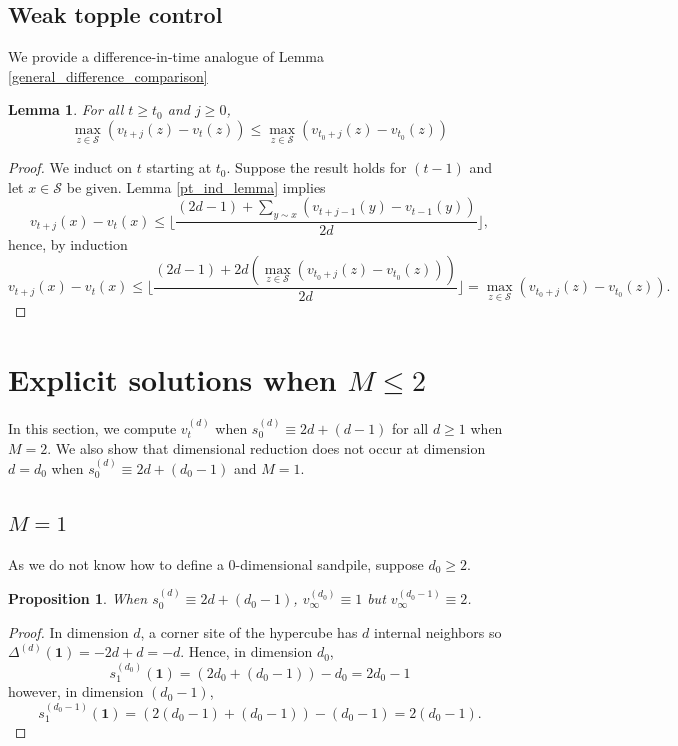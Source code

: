 \documentclass[12pt]{amsart}
\newtheorem{prop}{Proposition}[section]
\newtheorem{lemma}[theorem]{Lemma}
\begin{document}
	
	\subsection{Weak topple control}	
	We provide a difference-in-time analogue of Lemma \ref{general_difference_comparison}

	\begin{lemma} \label{topple_limit}
	For all $t \geq t_0$ and $j \geq 0$, 
	\[
	\max_{z \in \mathcal{S}} \left( v_{t+j}(z) - v_t(z) \right) \leq \max_{z \in \mathcal{S}} \left( v_{t_0+j}(z) - v_{t_0}(z) \right)
	\]
	\end{lemma}

	
	\begin{proof}
		We induct on $t$ starting at $t_0$. Suppose the result holds for $(t-1)$
		and let $x \in \mathcal{S}$ be given.
		Lemma \ref{pt_ind_lemma} implies  
		\[
		v_{t + j}(x) - v_{t}(x) \leq \lfloor \frac{ (2d-1) + \sum_{y \sim x} \left(v_{t+j-1}(y) - v_{t-1}(y) \right) }{2 d} \rfloor, 
		\]		
		hence, by induction 
		\[
			v_{t + j}(x) - v_{t}(x) \leq \lfloor \frac{ (2d-1) + 2 d\left( \max_{z \in \mathcal{S}} \left( v_{t_0+j}(z) - v_{t_0}(z) \right) \right) }{2 d} \rfloor =  \max_{z \in \mathcal{S}} \left( v_{t_0+j}(z) - v_{t_0}(z) \right). 
		\]

		
	\end{proof}
	
	
	
	\section{Explicit solutions when \texorpdfstring{$M \leq 2$}{M <= 2}} \label{sec:base_case}
	
	In this section, we compute $v_t^{(d)}$ when $s_0^{(d)} \equiv 2 d + (d-1)$ for all $d \geq 1$ when $M=2$.
	We also show that dimensional reduction does not occur at dimension
	$d=d_0$ when $s^{(d)}_0 \equiv 2 d + (d_0-1)$ and $M=1$. 
	
	
	
	\subsection{\texorpdfstring{$M=1$}{M=1}}
	As we do not know how to define a $0$-dimensional sandpile, suppose $d_0 \geq 2$. 
	\begin{prop}
	 When $s_0^{(d)} \equiv 2 d + (d_0-1)$,  $v_\infty^{(d_0)} \equiv 1$ but $v_\infty^{(d_0-1)} \equiv 2$.
	\end{prop}
	\begin{proof} 
		In dimension $d$, a corner site of the hypercube has $d$ internal neighbors so 
		$\Delta^{(d)} (\mathbf{1}) = - 2 d + d = -d $.
		Hence, in dimension $d_0$, 
		\[
		s_1^{(d_0)}(\mathbf{1}) = (2 d_0 + (d_0-1))- d_0 = 2 d_0 - 1
		\]
		however, in dimension $(d_0-1)$, 
		\[
		s_1^{(d_0-1)}(\mathbf{1}) = (2 (d_0-1) + (d_0-1)) - (d_0-1) = 2(d_0-1).
		\]
	\end{proof}
	
\end{document}
